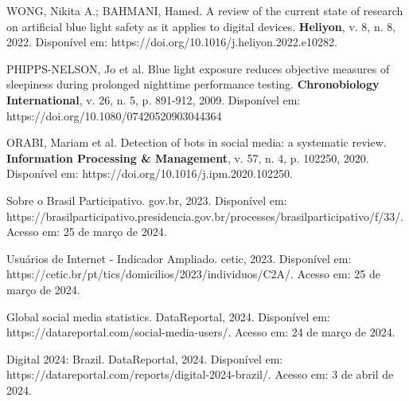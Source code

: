  WONG, Nikita A.; BAHMANI, Hamed. A review of the current state of research on artificial blue light safety as it applies to digital devices. \textbf{Heliyon}, v. 8, n. 8, 2022. Disponível em: https://doi.org/10.1016/j.heliyon.2022.e10282.

 PHIPPS-NELSON, Jo et al. Blue light exposure reduces objective measures of sleepiness during prolonged nighttime performance testing. \textbf{Chronobiology International}, v. 26, n. 5, p. 891-912, 2009. Disponível em: https://doi.org/10.1080/07420520903044364

 ORABI, Mariam et al. Detection of bots in social media: a systematic review. \textbf{Information Processing \& Management}, v. 57, n. 4, p. 102250, 2020. Disponível em: https://doi.org/10.1016/j.ipm.2020.102250.



Sobre o Brasil Participativo. gov.br, 2023. Disponível em: https://brasilparticipativo.presidencia.gov.br/processes/brasilparticipativo/f/33/. Acesso em: 25 de março de 2024.

Usuários de Internet - Indicador Ampliado. cetic, 2023. Disponível em: https://cetic.br/pt/tics/domicilios/2023/individuos/C2A/. Acesso em: 25 de março de 2024.

Global social media statistics. DataReportal, 2024. Disponível em: https://datareportal.com/social-media-users/. Acesso em: 24 de março de 2024.

Digital 2024: Brazil. DataReportal, 2024. Disponível em: https://datareportal.com/reports/digital-2024-brazil/. Acesso em: 3 de abril de 2024.











